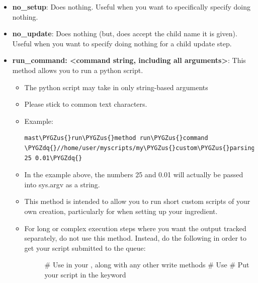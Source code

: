 \documentclass[letterpaper,10pt,english]{sphinxmanual}
\def\PYGZus{\char`\_}
\def\PYGZdq{\char`\"}
\begin{document}
\begin{itemize}
\item {} 
\textbf{no\_setup}: Does nothing. Useful when you want to specifically specify doing nothing.

\item {} 
\textbf{no\_update}: Does nothing (but, does accept the child name it is given). Useful when you want to specify doing nothing for a child update step.

\item {} 
\textbf{run\_command: \textless{}command string, including all arguments\textgreater{}}: This method allows you to run a python script.
\begin{itemize}
\item {} 
The python script may take in only string-based arguments

\item {} 
Please stick to common text characters.

\item {} 
Example:

\begin{Verbatim}[commandchars=\\\{\}]
mast\PYGZus{}run\PYGZus{}method run\PYGZus{}command \PYGZdq{}//home/user/myscripts/my\PYGZus{}custom\PYGZus{}parsing.py 25 0.01\PYGZdq{}
\end{Verbatim}

\item {} 
In the example above, the numbers 25 and 0.01 will actually be passed into sys.argv as a string.

\item {} 
This method is intended to allow you to run short custom scripts of your own creation, particularly for  when setting up your ingredient.

\item {} \begin{description}
\item[{For long or complex execution steps where you want the output tracked separately, do not use this method. Instead, do the following in order to get your script submitted to the queue:}] \leavevmode
\#  Use  in your , along with any other write methods
\#  Use 
\#  Put your script in the  keyword

\end{description}

\end{itemize}

\end{itemize}
\end{document}
